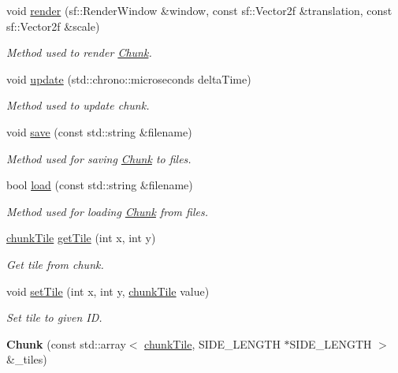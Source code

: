 \begin{DoxyCompactItemize}
\item 
void \hyperlink{classChunk_a0353e35c14d4f576542660bb762db51f}{render} (sf\-::\-Render\-Window \&window, const sf\-::\-Vector2f \&translation, const sf\-::\-Vector2f \&scale)
\begin{DoxyCompactList}\small\item\em Method used to render \hyperlink{classChunk}{Chunk}. \end{DoxyCompactList}\item 
void \hyperlink{classChunk_aa794fcda8fe859680cbfe4a2bcd5d097}{update} (std\-::chrono\-::microseconds delta\-Time)
\begin{DoxyCompactList}\small\item\em Method used to update chunk. \end{DoxyCompactList}\item 
void \hyperlink{classChunk_ac3e70286e057eb0f93accec639047097}{save} (const std\-::string \&filename)
\begin{DoxyCompactList}\small\item\em Method used for saving \hyperlink{classChunk}{Chunk} to files. \end{DoxyCompactList}\item 
bool \hyperlink{classChunk_afa9fe7d9713cbf4fbe75520dd760880a}{load} (const std\-::string \&filename)
\begin{DoxyCompactList}\small\item\em Method used for loading \hyperlink{classChunk}{Chunk} from files. \end{DoxyCompactList}\item 
\hyperlink{structchunkTile}{chunk\-Tile} \hyperlink{classChunk_a4536eb6a455208974eb86919f3bee594}{get\-Tile} (int x, int y)
\begin{DoxyCompactList}\small\item\em Get tile from chunk. \end{DoxyCompactList}\item 
void \hyperlink{classChunk_a7f0eaf39751a73718b7903e2138deb64}{set\-Tile} (int x, int y, \hyperlink{structchunkTile}{chunk\-Tile} value)
\begin{DoxyCompactList}\small\item\em Set tile to given I\-D. \end{DoxyCompactList}\item 
\hypertarget{classChunk_ab157196a12abf9024ea638104c70fa97}{{\bfseries Chunk} (const std\-::array$<$ \hyperlink{structchunkTile}{chunk\-Tile}, S\-I\-D\-E\-\_\-\-L\-E\-N\-G\-T\-H $\ast$S\-I\-D\-E\-\_\-\-L\-E\-N\-G\-T\-H $>$ \&\-\_\-tiles)}\label{classChunk_ab157196a12abf9024ea638104c70fa97}

\end{DoxyCompactItemize}
